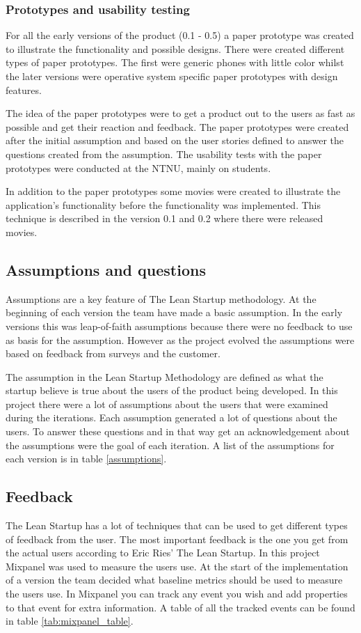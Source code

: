 \subsubsection{Prototypes and usability testing}
For all the early versions of the product (0.1 - 0.5) a paper prototype was created  to illustrate the functionality and possible designs. There were created different types of paper prototypes. The first were generic phones with little color whilst the later versions were operative system specific paper prototypes with design features. 

The idea of the paper prototypes were to get a product out to the users as fast as possible and get their reaction and feedback. The paper prototypes were created after the initial assumption and based on the user stories defined to answer the questions created from the assumption. The usability tests with the paper prototypes were conducted at the \gls{NTNU}, mainly on students. 

In addition to the paper prototypes some movies were created to illustrate the application’s functionality before the functionality was implemented. This technique is described in the version 0.1 and 0.2 where there were released movies. 

\subsection{Assumptions and questions}
Assumptions are a key feature of The Lean Startup methodology. At the beginning of each version the team have made a basic assumption. In the early versions this was leap-of-faith assumptions because there were no feedback to use as basis for the assumption. However as the project evolved the assumptions were based on feedback from surveys and the customer. 

The assumption in the Lean Startup Methodology are defined as what the startup believe is true about the users of the product being developed. \cite{lean-startup} In this project there were a lot of assumptions about the users that were examined during the iterations. Each assumption generated a lot of questions about the users. To answer these questions and in that way get an acknowledgement about the assumptions were the goal of each iteration. A list of the assumptions for each version is in table \ref{assumptions}. 



\subsection{Feedback}
\label{feedback}
The Lean Startup has a lot of techniques that can be used to get different types of feedback from the user. The most important feedback is the one you get from the actual users according to Eric Ries’ The Lean Startup. In this project Mixpanel was used to measure the users use. At the start of the implementation of a version the team decided what baseline metrics should be used to measure the users use. In Mixpanel you can track any event you wish and add properties to that event for extra information. A table of all the tracked events can be found in table \ref{tab:mixpanel_table}.

